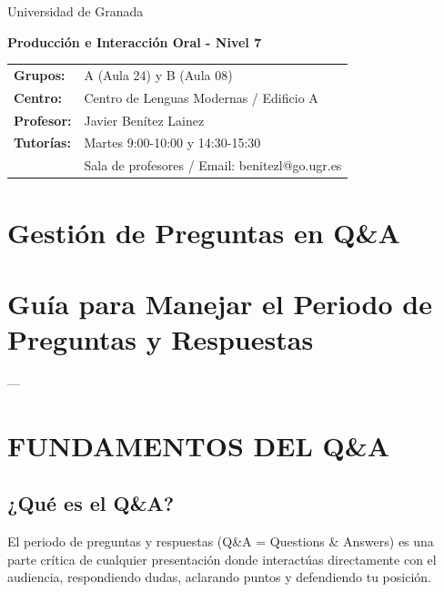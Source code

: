 \documentclass[a4paper,11pt]{article}
\begin{document}
\begin{center}
\small{Universidad de Granada}

\vspace{0.3cm}

\textbf{\large{Producción e Interacción Oral - Nivel 7}}

\vspace{0.4cm}

\small
\begin{tabular}{@{}ll@{}}
\textbf{Grupos:} & A (Aula 24) y B (Aula 08) \\
\textbf{Centro:} & Centro de Lenguas Modernas / Edificio A \\
\textbf{Profesor:} & Javier Benítez Lainez \\
\textbf{Tutorías:} & Martes 9:00-10:00 y 14:30-15:30 \\
& Sala de profesores / Email: benitezl@go.ugr.es
\end{tabular}
\end{center}

\vspace{0.5cm}
\section*{Gestión de Preguntas en Q&A}

\vspace{0.4cm}

\section{Guía para Manejar el Periodo de Preguntas y Respuestas}

\vspace{0.2cm}

---

\vspace{0.2cm}

\section{FUNDAMENTOS DEL Q&A}

\vspace{0.2cm}

\subsection{¿Qué es el Q&A?}

El periodo de preguntas y respuestas (Q&A = Questions & Answers) es una parte crítica de cualquier presentación donde interactúas directamente con el audiencia, respondiendo dudas, aclarando puntos y defendiendo tu posición.
\end{document}
